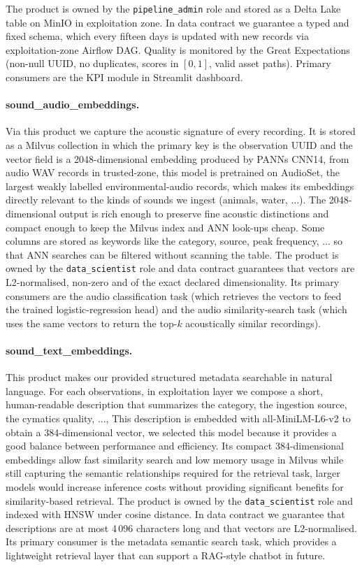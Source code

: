 \documentclass[11pt,a4paper]{article}
\begin{document}
The product is owned by the \texttt{pipeline\_admin} role and stored as a Delta Lake table on MinIO in exploitation zone. In data contract we guarantee a typed and fixed schema, which every fifteen days is updated with new records via exploitation-zone Airflow DAG. Quality is monitored by the Great Expectations (non-null UUID, no duplicates, scores in $[0,1]$, valid asset paths). Primary consumers are the KPI module in Streamlit dashboard.

\paragraph{sound\_audio\_embeddings.} Via this product we capture the acoustic signature of every recording. It is stored as a Milvus collection in which the primary key is the observation UUID and the vector field is a 2048-dimensional embedding produced by PANNs CNN14, from audio WAV records in trusted-zone, this model is pretrained on AudioSet, the largest weakly labelled environmental-audio records, which makes its embeddings directly relevant to the kinds of sounds we ingest (animals, water, ...). The 2048-dimensional output is rich enough to preserve fine acoustic distinctions and compact enough to keep the Milvus index and ANN look-ups cheap. Some columns are stored as keywords like the category, source, peak frequency, ... so that ANN searches can be filtered without scanning the table. The product is owned by the \texttt{data\_scientist} role and data contract guarantees that vectors are L2-normalised, non-zero and of the exact declared dimensionality. Its primary consumers are the audio classification task (which retrieves the vectors to feed the trained logistic-regression head) and the audio similarity-search task (which uses the same vectors to return the top-$k$ acoustically similar recordings).

\paragraph{sound\_text\_embeddings.} This product makes our provided structured metadata searchable in natural language. For each observations, in exploitation layer we compose a short, human-readable description that summarizes the category, the ingestion source, the cymatics quality, ..., This description is embedded with all-MiniLM-L6-v2 to obtain a 384-dimensional vector, we selected this model because it provides a good balance between performance and efficiency. Its compact 384-dimensional embeddings allow fast similarity search and low memory usage in Milvus while still capturing the semantic relationships required for the retrieval task, larger models would increase inference costs without providing significant benefits for similarity-based retrieval. The product is owned by the \texttt{data\_scientist} role and indexed with HNSW under cosine distance. In data contract we guarantee that descriptions are at most 4\,096 characters long and that vectors are L2-normalised. Its primary consumer is the metadata semantic search task, which provides a lightweight retrieval layer that can support a RAG-style chatbot in future.
\end{document}
